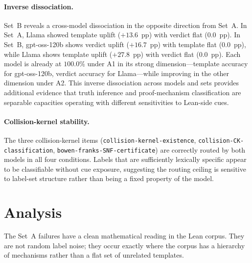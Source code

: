 \documentclass[11pt]{article}
\begin{document}
\paragraph{Inverse dissociation.}
Set~B reveals a cross-model dissociation in the opposite direction from
Set~A.
In Set~A, Llama showed template uplift ($+13.6$~pp) with verdict flat ($0.0$~pp).
In Set~B, gpt-oss-120b shows verdict uplift ($+16.7$~pp) with template flat
($0.0$~pp), while Llama shows template uplift ($+27.8$~pp) with verdict flat
($0.0$~pp).
Each model is already at $100.0\%$ under A1 in its strong
dimension---template accuracy for gpt-oss-120b, verdict accuracy for
Llama---while improving in the other dimension under A2.
This inverse dissociation across models and sets provides additional
evidence that truth inference and proof-mechanism classification are
separable capacities operating with different sensitivities to Lean-side cues.

\paragraph{Collision-kernel stability.}
The three collision-kernel items
(\texttt{collision{-}kernel{-}existence},
\texttt{collision{-}CK{-}classification},
\texttt{bowen{-}franks{-}SNF{-}certificate})
are correctly routed by both models in all four conditions.
Labels that are sufficiently lexically specific appear to be classifiable
without cue exposure, suggesting the routing ceiling is sensitive to
label-set structure rather than being a fixed property of the model.

\section{Analysis}
\label{sec:analysis}

The Set~A failures have a clean mathematical reading in the Lean corpus.
They are not random label noise; they occur exactly where the corpus has a
hierarchy of mechanisms rather than a flat set of unrelated templates.
\end{document}
